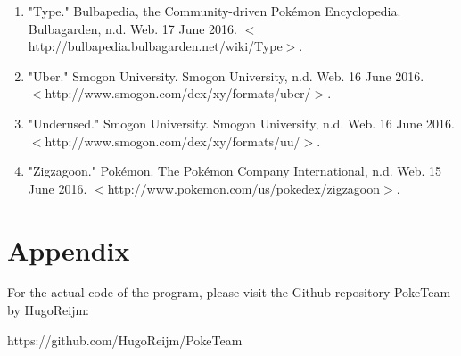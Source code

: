 \documentclass{article}
\begin{document}
\begin{enumerate}
	\item "Type." Bulbapedia, the Community-driven Pokémon Encyclopedia. Bulbagarden, n.d. Web. 17 June 2016. $<$http://bulbapedia.bulbagarden.net/wiki/Type$>$.
	\item "Uber." Smogon University. Smogon University, n.d. Web. 16 June 2016. \\$<$http://www.smogon.com/dex/xy/formats/uber/$>$.
	\item "Underused." Smogon University. Smogon University, n.d. Web. 16 June 2016. \\$<$http://www.smogon.com/dex/xy/formats/uu/$>$.
	\item "Zigzagoon." Pok\'emon. The Pok\'emon Company International, n.d. Web. 15 June 2016. $<$http://www.pokemon.com/us/pokedex/zigzagoon$>$.
\end{enumerate}
\section{Appendix}
For the actual code of the program, please visit the Github repository PokeTeam by HugoReijm:\\
\begin{center}
	https://github.com/HugoReijm/PokeTeam
\end{center}
\end{document}

